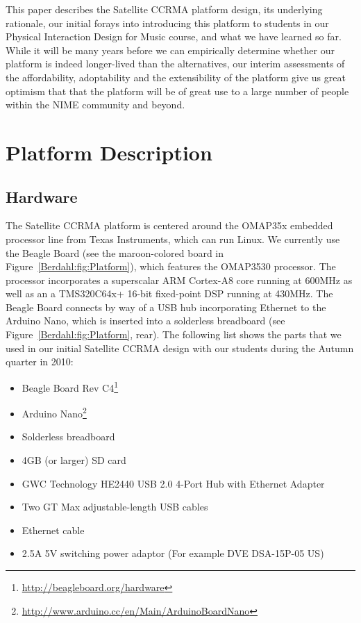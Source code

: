 This paper describes the Satellite CCRMA platform design, its underlying rationale, our initial forays into introducing this platform to students in our Physical Interaction Design for Music course, and what we have learned so far. While it will be many years before we can empirically determine whether our platform is indeed longer-lived than the alternatives, our interim assessments of the affordability, adoptability and the extensibility of the platform give us great optimism that that the platform will be of great use to a large number of people within the NIME community and beyond. 

\section{Platform Description}
\subsection{Hardware}
The Satellite CCRMA platform is centered around the OMAP35x embedded processor line from Texas Instruments, which can run Linux.  We currently use the Beagle Board (see the maroon-colored board in Figure~\ref{Berdahl:fig:Platform}), which features the OMAP3530 processor.  The processor incorporates a superscalar ARM Cortex-A8 core running at 600MHz as well as an a TMS320C64x+ 16-bit fixed-point DSP running at 430MHz.  The Beagle Board connects by way of a USB hub incorporating Ethernet to the Arduino Nano, which is inserted into a solderless breadboard (see Figure~\ref{Berdahl:fig:Platform}, rear).  The following list shows the parts that we used in our initial Satellite CCRMA design with our students during the Autumn quarter in 2010:

\begin{itemize}
\item Beagle Board Rev C4\footnote{\url{http://beagleboard.org/hardware}}
\item Arduino Nano\footnote{\url{http://www.arduino.cc/en/Main/ArduinoBoardNano}}
\item Solderless breadboard
\item 4GB (or larger) SD card 
\item GWC Technology HE2440 USB 2.0 4-Port Hub with Ethernet Adapter
\item Two GT Max adjustable-length USB cables
\item Ethernet cable
\item 2.5A 5V switching power adaptor (For example DVE DSA-15P-05 US)
\end{itemize}

